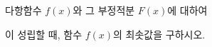 다항함수 $f(x)$와 그 부정적분 $F(x)$에 대하여 \par\smallskip{}\par\smallskip\noindent 이 성립할 때, 함수 $f(x)$의 최솟값을 구하시오.
